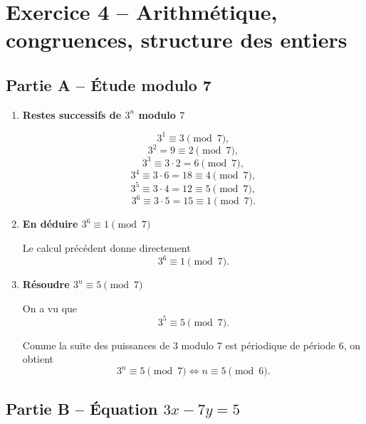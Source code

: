 \documentclass[11pt,a4paper]{article}
\begin{document}
\section*{Exercice 4 -- Arithmétique, congruences, structure des entiers}

\subsection*{Partie A -- Étude modulo 7}

\begin{enumerate}[label=\textbf{4.\arabic*}, leftmargin=1.6em]

\item \textbf{Restes successifs de \(3^n\) modulo \(7\)}

\[
3^1\equiv 3 \pmod 7,
\]
\[
3^2=9\equiv 2 \pmod 7,
\]
\[
3^3\equiv 3\cdot 2=6 \pmod 7,
\]
\[
3^4\equiv 3\cdot 6=18\equiv 4 \pmod 7,
\]
\[
3^5\equiv 3\cdot 4=12\equiv 5 \pmod 7,
\]
\[
3^6\equiv 3\cdot 5=15\equiv 1 \pmod 7.
\]

\item \textbf{En déduire \(3^6\equiv 1\pmod 7\)}

Le calcul précédent donne directement
\[
\boxed{3^6\equiv 1 \pmod 7.}
\]

\item \textbf{Résoudre \(3^n\equiv 5 \pmod 7\)}

On a vu que
\[
3^5\equiv 5\pmod 7.
\]

Comme la suite des puissances de \(3\) modulo \(7\) est périodique de période \(6\), on obtient
\[
\boxed{3^n\equiv 5\pmod 7 \Longleftrightarrow n\equiv 5\pmod 6.}
\]

\end{enumerate}

\subsection*{Partie B -- Équation \(3x-7y=5\)}
\end{document}
